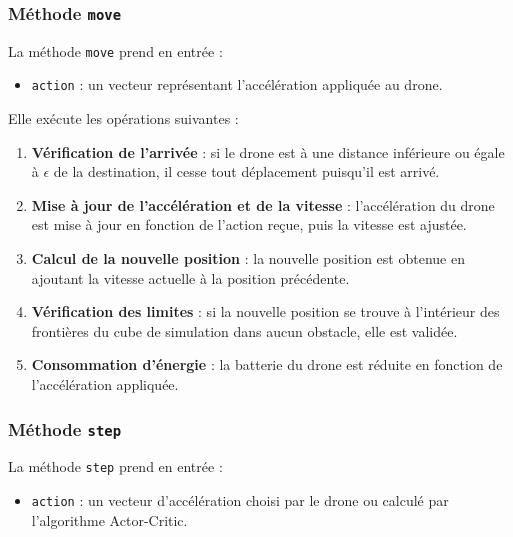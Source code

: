 \documentclass[a4paper, 12pt]{article}
\begin{document}
\subsubsection{Méthode \texttt{move}}

La méthode \texttt{move} prend en entrée :
\begin{itemize}
    \item \texttt{action} : un vecteur représentant l’accélération appliquée au drone.
\end{itemize}

Elle exécute les opérations suivantes :
\begin{enumerate}
    \item \textbf{Vérification de l’arrivée} : si le drone est à une distance inférieure ou égale à $\epsilon$ de la destination, il cesse tout déplacement puisqu'il est arrivé.
    \item \textbf{Mise à jour de l’accélération et de la vitesse} : l’accélération du drone est mise à jour en fonction de l’action reçue, puis la vitesse est ajustée.
    \item \textbf{Calcul de la nouvelle position} : la nouvelle position est obtenue en ajoutant la vitesse actuelle à la position précédente.
    \item \textbf{Vérification des limites} : si la nouvelle position se trouve à l’intérieur des frontières du cube de simulation dans aucun obstacle, elle est validée.
    \item \textbf{Consommation d’énergie} : la batterie du drone est réduite en fonction de l’accélération appliquée.
\end{enumerate}

\subsubsection{Méthode \texttt{step}}

La méthode \texttt{step} prend en entrée :
\begin{itemize}
    \item \texttt{action} : un vecteur d’accélération choisi par le drone ou calculé par l’algorithme Actor-Critic.
\end{itemize}
\end{document}
